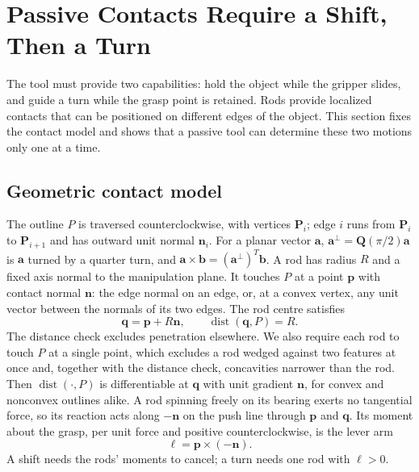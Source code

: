 \section{Passive Contacts Require a Shift, Then a Turn}
\label{sec:design}

The tool must provide two capabilities: hold the object while the gripper slides, and guide a turn while the grasp point is retained. Rods provide localized contacts that can be positioned on different edges of the object. This section fixes the contact model and shows that a passive tool can determine these two motions only one at a time.

\subsection{Geometric contact model}
\label{sec:contact_model}

The outline $P$ is traversed counterclockwise, with vertices $\mathbf P_i$; edge $i$ runs from $\mathbf P_i$ to $\mathbf P_{i+1}$ and has outward unit normal $\mathbf n_i$. For a planar vector $\mathbf a$, $\mathbf a^\perp=\mathbf Q(\pi/2)\mathbf a$ is $\mathbf a$ turned by a quarter turn, and $\mathbf a\times\mathbf b=(\mathbf a^\perp)^T\mathbf b$. A rod has radius $R$ and a fixed axis normal to the manipulation plane. It touches $P$ at a point $\mathbf p$ with contact normal $\mathbf n$: the edge normal on an edge, or, at a convex vertex, any unit vector between the normals of its two edges. The rod centre satisfies
\begin{equation}
  \mathbf q=\mathbf p+R\mathbf n,\qquad \operatorname{dist}(\mathbf q,P)=R.
  \label{eq:rod_center}
\end{equation}
The distance check excludes penetration elsewhere. We also require each rod to touch $P$ at a single point, which excludes a rod wedged against two features at once and, together with the distance check, concavities narrower than the rod. Then $\operatorname{dist}(\cdot,P)$ is differentiable at $\mathbf q$ with unit gradient $\mathbf n$, for convex and nonconvex outlines alike. A rod spinning freely on its bearing exerts no tangential force, so its reaction acts along $-\mathbf n$ on the push line through $\mathbf p$ and $\mathbf q$. Its moment about the grasp, per unit force and positive counterclockwise, is the lever arm
\begin{equation}
  \ell=\mathbf p\times(-\mathbf n).
  \label{eq:edge_identity}
\end{equation}
A shift needs the rods' moments to cancel; a turn needs one rod with $\ell>0$.

